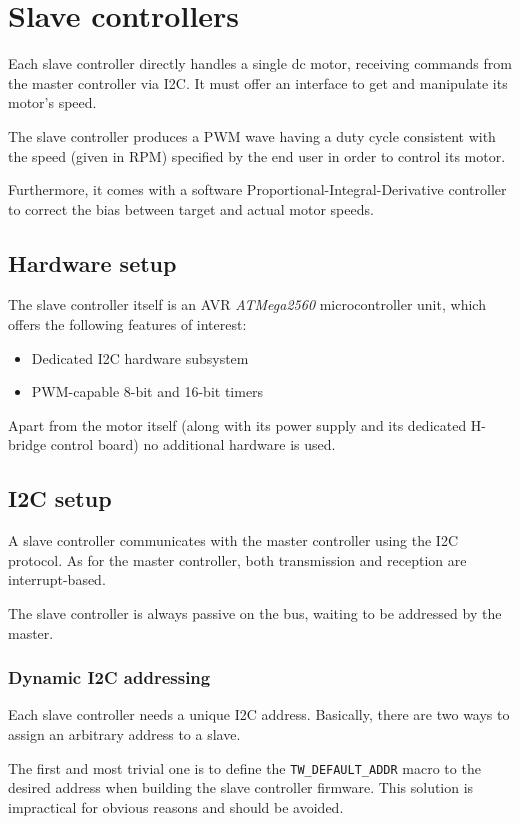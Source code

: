 \chapter{Slave controllers}
\label{ch:slave}
Each slave controller directly handles a single dc motor, receiving commands
from the master controller via I2C. It must offer an interface to get and
manipulate its motor's speed.

The slave controller produces a PWM wave having a duty cycle consistent with
the speed (given in RPM) specified by the end user in order to control its
motor.

Furthermore, it comes with a software Proportional-Integral-Derivative
controller to correct the bias between target and actual motor speeds.

\section{Hardware setup}
The slave controller itself is an AVR \emph{ATMega2560} microcontroller
unit\cite{at2560-ref}, which offers the following features of interest:

\begin{itemize}
  \item Dedicated I2C hardware subsystem
  \item PWM-capable 8-bit and 16-bit timers
\end{itemize}

Apart from the motor itself (along with its power supply and its dedicated
H-bridge control board) no additional hardware is used.

\section{I2C setup}
A slave controller communicates with the master controller using the I2C
protocol. As for the master controller, both transmission and reception are
interrupt-based.

The slave controller is always passive on the bus, waiting to be addressed by
the master.

\subsection{Dynamic I2C addressing}
Each slave controller needs a unique I2C address. Basically, there are two ways
to assign an arbitrary address to a slave.

The first and most trivial one is to define the \texttt{TW\_DEFAULT\_ADDR}
macro to the desired address when building the slave controller firmware. This
solution is impractical for obvious reasons and should be avoided.

